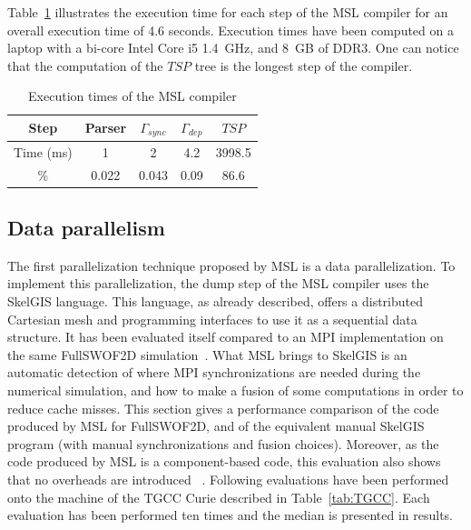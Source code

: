Table~\ref{fig:exectime} illustrates the execution time for each step of the MSL compiler for an overall execution time of 4.6 seconds. Execution times have been computed on a laptop with a bi-core Intel Core i5 1.4~GHz, and 8~GB of DDR3. One can notice that the computation of the $TSP$ tree is the longest step of the compiler.

\begin{table}[!h]
 \begin{center}
 \begin{tabular}{|c|c|c|c|c|}
  \hline
   Step & Parser & $\Gamma_{sync}$ & $\Gamma_{dep}$ & $TSP$\\
   \hline
   Time (ms) & 1 & 2 & 4.2 & 3998.5\\
   \hline
   \% & 0.022 & 0.043 & 0.09 & 86.6\\
   \hline
 \end{tabular}
\caption{Execution times of the MSL compiler}
\label{fig:exectime}
 \end{center}
\end{table}

\subsection{Data parallelism}

The first parallelization technique proposed by MSL is a data parallelization. To implement this parallelization, the dump step of the MSL compiler uses the SkelGIS language. This language, as already described, offers a distributed Cartesian mesh and programming interfaces to use it as a sequential data structure. It has been evaluated itself compared to an MPI implementation on the same FullSWOF2D simulation~\cite{CPE:CPE3494}. What MSL brings to SkelGIS is an automatic detection of where MPI synchronizations are needed during the numerical simulation, and how to make a fusion of some computations in order to reduce cache misses. This section gives a performance comparison of the code produced by MSL for FullSWOF2D, and of the equivalent manual SkelGIS program (with manual synchronizations and fusion choices). Moreover, as the code produced by MSL is a component-based code, this evaluation also shows that no overheads are introduced \llc~\cite{l2c}. Following evaluations have been performed onto the machine of the TGCC Curie described in Table~\ref{tab:TGCC}. Each evaluation has been performed ten times and the median is presented in results.

